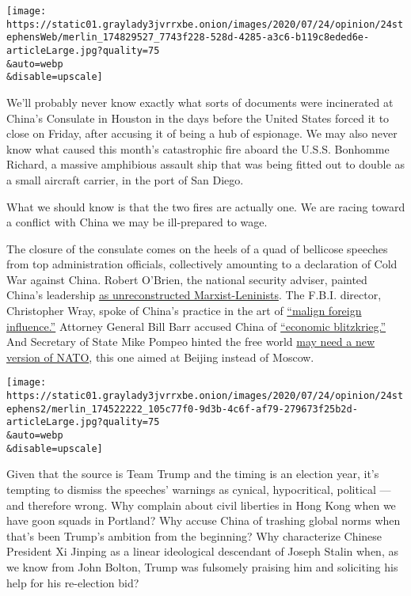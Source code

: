 \texttt{[image: https://static01.graylady3jvrrxbe.onion/images/2020/07/24/opinion/24stephensWeb/merlin\_174829527\_7743f228-528d-4285-a3c6-b119c8eded6e-articleLarge.jpg?quality=75\\\&auto=webp\\\&disable=upscale]}

We'll probably never know exactly what sorts of documents were
incinerated at China's Consulate in Houston in the days before the
United States forced it to close on Friday, after accusing it of being a
hub of espionage. We may also never know what caused this month's
catastrophic fire aboard the U.S.S. Bonhomme Richard, a massive
amphibious assault ship that was being fitted out to double as a small
aircraft carrier, in the port of San Diego.

What we should know is that the two fires are actually one. We are
racing toward a conflict with China we may be ill-prepared to wage.

The closure of the consulate comes on the heels of a quad of bellicose
speeches from top administration officials, collectively amounting to a
declaration of Cold War against China. Robert O'Brien, the national
security adviser, painted China's leadership
\href{https://www.whitehouse.gov/briefings-statements/chinese-communist-partys-ideology-global-ambitions/}{as
unreconstructed Marxist-Leninists}. The F.B.I. director, Christopher
Wray, spoke of China's practice in the art of
\href{https://www.fbi.gov/news/speeches/the-threat-posed-by-the-chinese-government-and-the-chinese-communist-party-to-the-economic-and-national-security-of-the-united-states}{``malign
foreign influence.''} Attorney General Bill Barr accused China of
\href{https://www.justice.gov/opa/speech/transcript-attorney-general-barr-s-remarks-china-policy-gerald-r-ford-presidential-museum}{``economic
blitzkrieg.''} And Secretary of State Mike Pompeo hinted the free world
\href{https://www.state.gov/communist-china-and-the-free-worlds-future/}{may
need a new version of NATO}, this one aimed at Beijing instead of
Moscow.

\texttt{[image: https://static01.graylady3jvrrxbe.onion/images/2020/07/24/opinion/24stephens2/merlin\_174522222\_105c77f0-9d3b-4c6f-af79-279673f25b2d-articleLarge.jpg?quality=75\\\&auto=webp\\\&disable=upscale]}

Given that the source is Team Trump and the timing is an election year,
it's tempting to dismiss the speeches' warnings as cynical,
hypocritical, political --- and therefore wrong. Why complain about
civil liberties in Hong Kong when we have goon squads in Portland? Why
accuse China of trashing global norms when that's been Trump's ambition
from the beginning? Why characterize Chinese President Xi Jinping as a
linear ideological descendant of Joseph Stalin when, as we know from
John Bolton, Trump was fulsomely praising him and soliciting his help
for his re-election bid?

